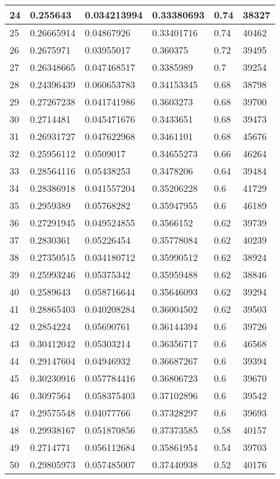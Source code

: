 \begin{longtable}{|l|l|l|l|l|l|}
24 & 0.255643 & 0.034213994 & 0.33380693 & 0.74 & 38327 \\ \hline 
25 & 0.26665914 & 0.04867926 & 0.33401716 & 0.74 & 40462 \\ \hline 
26 & 0.2675971 & 0.03955017 & 0.360375 & 0.72 & 39495 \\ \hline 
27 & 0.26348665 & 0.047468517 & 0.3385989 & 0.7 & 39254 \\ \hline 
28 & 0.24396439 & 0.060653783 & 0.34153345 & 0.68 & 38798 \\ \hline 
29 & 0.27267238 & 0.041741986 & 0.3603273 & 0.68 & 39700 \\ \hline 
30 & 0.2714481 & 0.045471676 & 0.3433651 & 0.68 & 39473 \\ \hline 
31 & 0.26931727 & 0.047622968 & 0.3461101 & 0.68 & 45676 \\ \hline 
32 & 0.25956112 & 0.0509017 & 0.34655273 & 0.66 & 46264 \\ \hline 
33 & 0.28564116 & 0.05438253 & 0.3478206 & 0.64 & 39484 \\ \hline 
34 & 0.28386918 & 0.041557204 & 0.35206228 & 0.6 & 41729 \\ \hline 
35 & 0.2959389 & 0.05768282 & 0.35947955 & 0.6 & 46189 \\ \hline 
36 & 0.27291945 & 0.049524855 & 0.3566152 & 0.62 & 39739 \\ \hline 
37 & 0.2830361 & 0.05226454 & 0.35778084 & 0.62 & 40239 \\ \hline 
38 & 0.27350515 & 0.034180712 & 0.35990512 & 0.62 & 38924 \\ \hline 
39 & 0.25993246 & 0.05375342 & 0.35959488 & 0.62 & 38846 \\ \hline 
40 & 0.2589643 & 0.058716644 & 0.35646093 & 0.62 & 39294 \\ \hline 
41 & 0.28865403 & 0.040208284 & 0.36004502 & 0.62 & 39503 \\ \hline 
42 & 0.2854224 & 0.05690761 & 0.36144394 & 0.6 & 39726 \\ \hline 
43 & 0.30412042 & 0.05303214 & 0.36356717 & 0.6 & 46568 \\ \hline 
44 & 0.29147604 & 0.04946932 & 0.36687267 & 0.6 & 39394 \\ \hline 
45 & 0.30230916 & 0.057784416 & 0.36806723 & 0.6 & 39670 \\ \hline 
46 & 0.3097564 & 0.058375403 & 0.37102896 & 0.6 & 39542 \\ \hline 
47 & 0.29575548 & 0.04077766 & 0.37328297 & 0.6 & 39693 \\ \hline 
48 & 0.29938167 & 0.051870856 & 0.37373585 & 0.58 & 40157 \\ \hline 
49 & 0.2714771 & 0.056112684 & 0.35861954 & 0.54 & 39703 \\ \hline 
50 & 0.29805973 & 0.057485007 & 0.37440938 & 0.52 & 40176 \\ \hline 
\end{longtable}